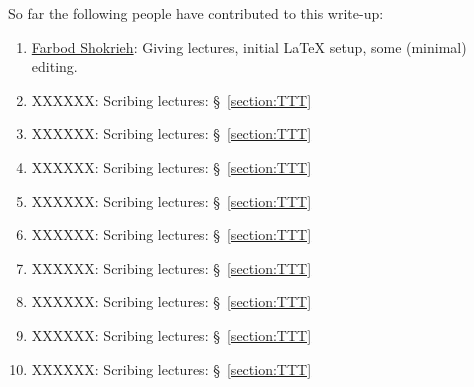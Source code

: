 



\vspace{+.5cm}

So far the following people have contributed to this write-up:
\begin{enumerate}
\item \href{http://www.math.cornell.edu/~farbod}{Farbod Shokrieh}: Giving lectures, initial LaTeX setup, some (minimal) editing.
\item XXXXXX: Scribing lectures: \S~\ref{section:TTT}
\item XXXXXX: Scribing lectures: \S~\ref{section:TTT}
\item XXXXXX: Scribing lectures: \S~\ref{section:TTT}
\item XXXXXX: Scribing lectures: \S~\ref{section:TTT}
\item XXXXXX: Scribing lectures: \S~\ref{section:TTT}
\item XXXXXX: Scribing lectures: \S~\ref{section:TTT}
\item XXXXXX: Scribing lectures: \S~\ref{section:TTT}
\item XXXXXX: Scribing lectures: \S~\ref{section:TTT}
\item XXXXXX: Scribing lectures: \S~\ref{section:TTT}
\end{enumerate}




